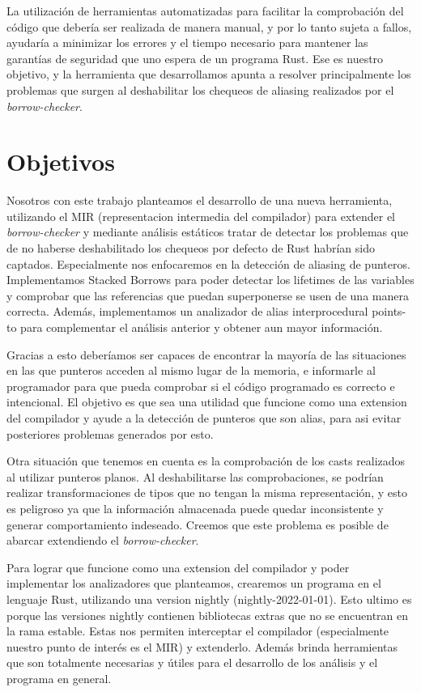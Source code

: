 La utilización de herramientas automatizadas para facilitar la comprobación del código que debería ser realizada de manera manual, y por lo tanto sujeta a fallos, ayudaría a minimizar los errores y el tiempo necesario para mantener las garantías de seguridad que uno espera de un programa Rust. Ese es nuestro objetivo, y la herramienta que desarrollamos apunta a resolver principalmente los problemas que surgen al deshabilitar los chequeos de aliasing realizados por el \textit{borrow-checker}.


\section{Objetivos}

Nosotros con este trabajo planteamos el desarrollo de una nueva herramienta, utilizando el MIR (representacion intermedia del compilador) para extender el \textit{borrow-checker} y mediante análisis estáticos tratar de detectar los problemas que de no haberse deshabilitado los chequeos por defecto de Rust habrían sido captados. Especialmente nos enfocaremos en la detección de aliasing de punteros. Implementamos Stacked Borrows para poder detectar los lifetimes de las variables y comprobar que las referencias que puedan superponerse se usen de una manera correcta. Además, implementamos un analizador de alias interprocedural points-to \cite{interprocedural} \cite{fastaliasinganalisis} para complementar el análisis anterior y obtener aun mayor información.

Gracias a esto deberíamos ser capaces de encontrar la mayoría de las situaciones en las que punteros acceden al mismo lugar de la memoria, e informarle al programador para que pueda comprobar si el código programado es correcto e intencional. El objetivo es que sea una utilidad que funcione como una extension del compilador y ayude a la detección de punteros que son alias, para asi evitar posteriores problemas generados por esto.

Otra situación que tenemos en cuenta es la comprobación de los casts realizados al utilizar punteros planos. Al deshabilitarse las comprobaciones, se podrían realizar transformaciones de tipos que no tengan la misma representación, y esto es peligroso ya que la información almacenada puede quedar inconsistente y generar comportamiento indeseado.
Creemos que este problema es posible de abarcar extendiendo el \textit{borrow-checker}.

Para lograr que funcione como una extension del compilador y poder implementar los analizadores que planteamos, crearemos un programa en el lenguaje Rust, utilizando una version nightly (nightly-2022-01-01). Esto ultimo es porque las versiones nightly contienen bibliotecas extras que no se encuentran en la rama estable. Estas nos permiten interceptar el compilador (especialmente nuestro punto de interés es el MIR) y extenderlo. Además brinda herramientas que son totalmente necesarias y útiles para el desarrollo de los análisis y el programa en general.

